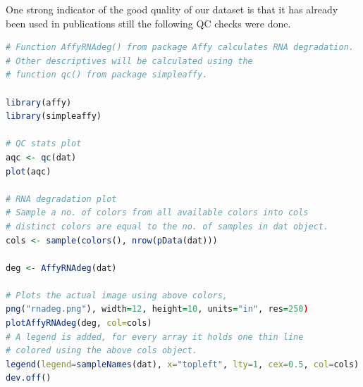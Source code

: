 \documentclass[oneside, a4paper, 11pt]{book}
\begin{document}
One strong indicator of the good quality of our dataset is that it has already been used in publications still the following QC checks were done.

\begin{lstlisting}[language=R, caption=Quality Control]
# Function AffyRNAdeg() from package Affy calculates RNA degradation.
# Other descriptives will be calculated using the
# function qc() from package simpleaffy.

library(affy)
library(simpleaffy)

# QC stats plot
aqc <- qc(dat)
plot(aqc)

# RNA degradation plot
# Sample a no. of colors from all available colors into cols
# distinct colors are equal to the no. of samples in dat object.
cols <- sample(colors(), nrow(pData(dat)))

deg <- AffyRNAdeg(dat)

# Plots the actual image using above colors,
png("rnadeg.png"), width=12, height=10, units="in", res=250)
plotAffyRNAdeg(deg, col=cols)
# A legend is added, for every array it holds one thin line
# colored using the above cols object.
legend(legend=sampleNames(dat), x="topleft", lty=1, cex=0.5, col=cols)
dev.off()
\end{lstlisting}
\end{document}
